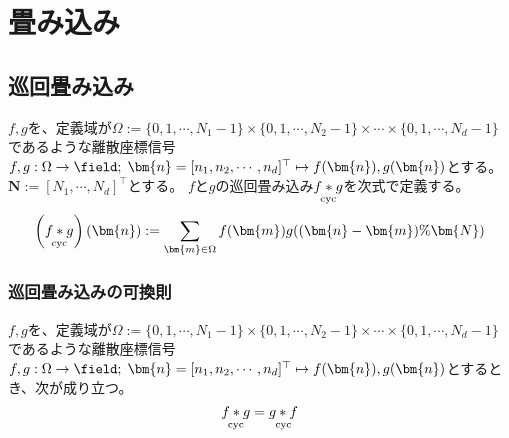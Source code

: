  \part{畳み込み}
		\chapter{巡回畳み込み}
		$f,g$を、定義域が$\Omega := \{0,1,\cdots,N_1-1\}\times\{0,1,\cdots,N_2-1\}\times\cdots\times\{0,1,\cdots,N_d-1\}$であるような離散座標信号$f,g: \Omega\to\field;\;\bm{n} = [n_1,n_2,\cdots,n_d]^\top \mapsto f(\bm{n}),g(\bm{n})$とする。
		$\bm{N} := [N_1,\cdots,N_d]^\top$とする。
		$f$と$g$の巡回畳み込み$\underset{\text{cyc}}{{f}*{g}}$を次式で定義する。
		\[ \left(\cycConv{f}{g}\right)(\bm{n}) := \sum_{\bm{m} \in\Omega} f(\bm{m})g((\bm{n}-\bm{m})\%\bm{N}) \]

		\section{巡回畳み込みの可換則}
			\begin{shadebox}
				$f,g$を、定義域が$\Omega := \{0,1,\cdots,N_1-1\}\times\{0,1,\cdots,N_2-1\}\times\cdots\times\{0,1,\cdots,N_d-1\}$であるような離散座標信号$f,g: \Omega\to\field;\;\bm{n} = [n_1,n_2,\cdots,n_d]^\top \mapsto f(\bm{n}),g(\bm{n})$とするとき、次が成り立つ。
				\[ \underset{\text{cyc}}{{f}*{g}} = \underset{\text{cyc}}{{g}*{f}} \]
			\end{shadebox}

